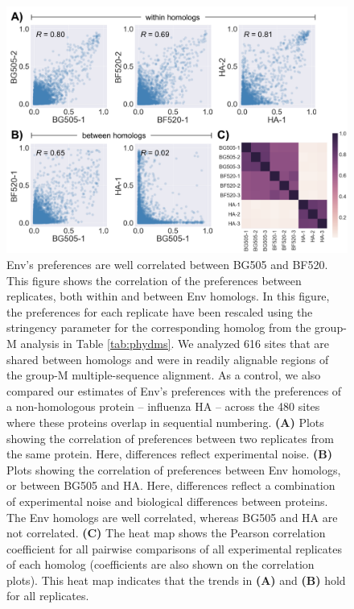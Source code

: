 \documentclass[9pt,lineno]{elife}
\begin{document}
\begin{figure}
\centerline{\includegraphics[width=6.5in]{figures/homologs_corr/homologs_corr.png}}
\caption{\label{fig:homologs_corr}
Env's preferences are well correlated between BG505 and BF520.
This figure shows the correlation of the preferences between replicates, both within and between Env homologs.
In this figure, the preferences for each replicate have been rescaled using the stringency parameter for the corresponding homolog from the group-M analysis in Table \ref{tab:phydms}.
We analyzed 616 sites that are shared between homologs and were in readily alignable regions of the group-M multiple-sequence alignment.
As a control, we also compared our estimates of Env's preferences with the preferences of a non-homologous protein -- influenza HA -- across the 480 sites where these proteins overlap in sequential numbering.
{\bf (A)} Plots showing the correlation of preferences between two replicates from the same protein.
Here, differences reflect experimental noise.
{\bf (B)} Plots showing the correlation of preferences between Env homologs, or between BG505 and HA.
Here, differences reflect a combination of experimental noise and biological differences between proteins.
The Env homologs are well correlated, whereas BG505 and HA are not correlated.
{\bf (C)} The heat map shows the Pearson correlation coefficient for all pairwise comparisons of all experimental replicates of each homolog (coefficients are also shown on the correlation plots).
This heat map indicates that the trends in {\bf (A)} and {\bf (B)} hold for all replicates.
}
\end{figure}
\end{document}
